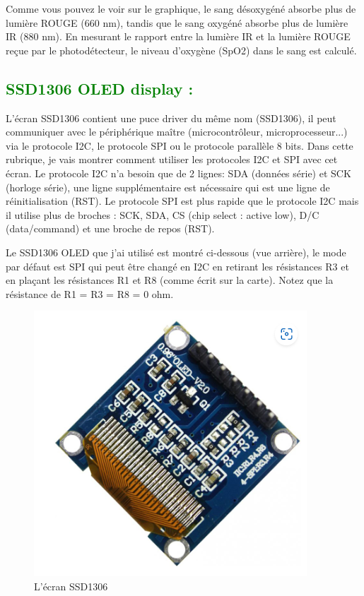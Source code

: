 \begin{flushleft}
\begin{figure}[h]
		\label{fig:labelname}
	\end{figure}
	Comme vous pouvez le voir sur le graphique, le sang désoxygéné absorbe plus de lumière ROUGE (660 nm), tandis que le sang oxygéné absorbe plus de lumière IR (880 nm). En mesurant le rapport entre la lumière IR et la lumière ROUGE reçue par le photodétecteur, le niveau d’oxygène (SpO2) dans le sang est calculé.
	
	\subsection{\textcolor{green}{SSD1306 OLED display :}}
	L’écran SSD1306 contient une puce driver du même nom (SSD1306), il peut communiquer avec le périphérique maître (microcontrôleur, microprocesseur...) via le protocole I2C, le protocole SPI ou le protocole parallèle 8 bits. Dans cette rubrique, je vais montrer comment utiliser les protocoles I2C et SPI avec cet écran.
	Le protocole I2C n’a besoin que de 2 lignes: SDA (données série) et SCK (horloge série), une ligne supplémentaire est nécessaire qui est une ligne de réinitialisation (RST). Le protocole SPI est plus rapide que le protocole I2C mais il utilise plus de broches : SCK, SDA, CS (chip select : active low), D/C (data/command) et une broche de repos (RST).
	
	Le SSD1306 OLED que j'ai utilisé est montré ci-dessous (vue arrière), le mode par défaut est SPI qui peut être changé en I2C en retirant les résistances R3 et en plaçant les résistances R1 et R8 (comme écrit sur la carte). Notez que la résistance de R1 = R3 = R8 = 0 ohm.
		\begin{figure}[h]
			\centering
			\includegraphics{chapitres/images/oled.PNG}
			\caption{L'écran SSD1306}
			\label{fig:labelname}
		\end{figure}

\end{flushleft}
